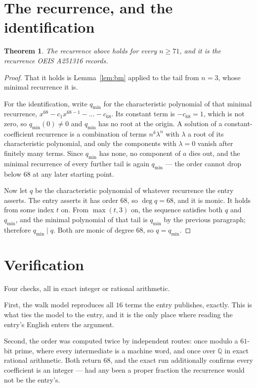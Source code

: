 \documentclass[11pt,a4paper]{article}
\theoremstyle{plain}
\newtheorem{theorem}{Theorem}
\theoremstyle{definition}
\begin{document}
\section{The recurrence, and the identification}

\begin{theorem}
The recurrence above holds for every $n\ge71$, and it is the recurrence OEIS A251316 records.
\end{theorem}

\begin{proof}
That it holds is Lemma~\ref{lem:bm} applied to the tail from $n=3$, whose minimal
recurrence it is.

For the identification, write $q_{\min}$ for the characteristic polynomial of that minimal
recurrence, $x^{68}-c_1x^{68-1}-\dots-c_{68}$. Its constant term is
$-c_{68}=1$, which is not zero, so $q_{\min}(0)\neq0$ and $q_{\min}$ has no
root at the origin. A solution of a constant-coefficient recurrence is a combination of terms
$n^{k}\lambda^{n}$ with $\lambda$ a root of its characteristic polynomial, and only the
components with $\lambda=0$ vanish after finitely many terms. Since $q_{\min}$ has none, no
component of $a$ dies out, and the minimal recurrence of every further tail is again
$q_{\min}$ --- the order cannot drop below $68$ at any later starting point.

Now let $q$ be the characteristic polynomial of whatever recurrence the entry asserts. The
entry asserts it has order $68$, so $\deg q=68$, and it is monic. It holds from some
index $t$ on. From $\max(t,3)$ on, the sequence satisfies both $q$ and $q_{\min}$, and
the minimal polynomial of that tail is $q_{\min}$ by the previous paragraph; therefore
$q_{\min}\mid q$. Both are monic of degree $68$, so $q=q_{\min}$.
\end{proof}

\section{Verification}

Four checks, all in exact integer or rational arithmetic.

First, the walk model reproduces all $16$ terms the entry publishes, exactly. This is
what ties the model to the entry, and it is the only place where reading the entry's English
enters the argument.

Second, the order was computed twice by independent routes: once modulo a $61$-bit prime, where
every intermediate is a machine word, and once over $\mathbb{Q}$ in exact rational arithmetic.
Both return $68$, and the exact run additionally confirms every coefficient is an integer
--- had any been a proper fraction the recurrence would not be the entry's.
\end{document}

